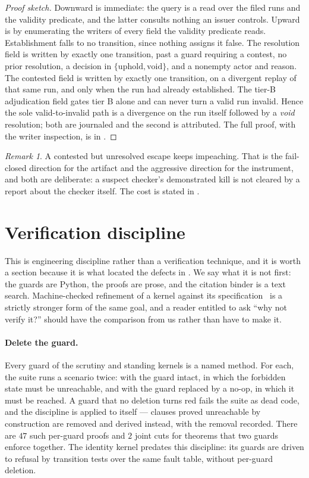 \documentclass[11pt,a4paper]{article}
\theoremstyle{plain}
\theoremstyle{definition}
\theoremstyle{remark}
\newtheorem*{remark}{Remark}
\begin{document}
\begin{proof}[Proof sketch]
Downward is immediate: the query is a read over the filed runs and the validity predicate, and the latter consults nothing an issuer controls. Upward is by enumerating the writers of every field the validity predicate reads. Establishment falls to no transition, since nothing assigns it false. The resolution field is written by exactly one transition, past a guard requiring a contest, no prior resolution, a decision in $\{\mathrm{uphold},\mathrm{void}\}$, and a nonempty actor and reason. The contested field is written by exactly one transition, on a divergent replay of that same run, and only when the run had already established. The tier-B adjudication field gates tier B alone and can never turn a valid run invalid. Hence the sole valid-to-invalid path is a divergence on the run itself followed by a \emph{void} resolution; both are journaled and the second is attributed. The full proof, with the writer inspection, is in .
\end{proof}

\begin{remark}
A contested but unresolved escape keeps impeaching. That is the fail-closed direction for the artifact and the aggressive direction for the instrument, and both are deliberate: a suspect checker's demonstrated kill is not cleared by a report about the checker itself. The cost is stated in .
\end{remark}

\section{Verification discipline}
\label{sec:method}

This is engineering discipline rather than a verification technique, and it is worth a section because it is what located the defects in . We say what it is not first: the guards are Python, the proofs are prose, and the citation binder is a text search. Machine-checked refinement of a kernel against its specification~\cite{sel4} is a strictly stronger form of the same goal, and a reader entitled to ask ``why not verify it?'' should have the comparison from us rather than have to make it.

\paragraph{Delete the guard.} Every guard of the scrutiny and standing kernels is a named method. For each, the suite runs a scenario twice: with the guard intact, in which the forbidden state must be unreachable, and with the guard replaced by a no-op, in which it must be reached. A guard that no deletion turns red fails the suite as dead code, and the discipline is applied to itself --- clauses proved unreachable by construction are removed and derived instead, with the removal recorded. There are $47$ such per-guard proofs and $2$ joint cuts for theorems that two guards enforce together. The identity kernel predates this discipline: its guards are driven to refusal by transition tests over the same fault table, without per-guard deletion.
\end{document}

